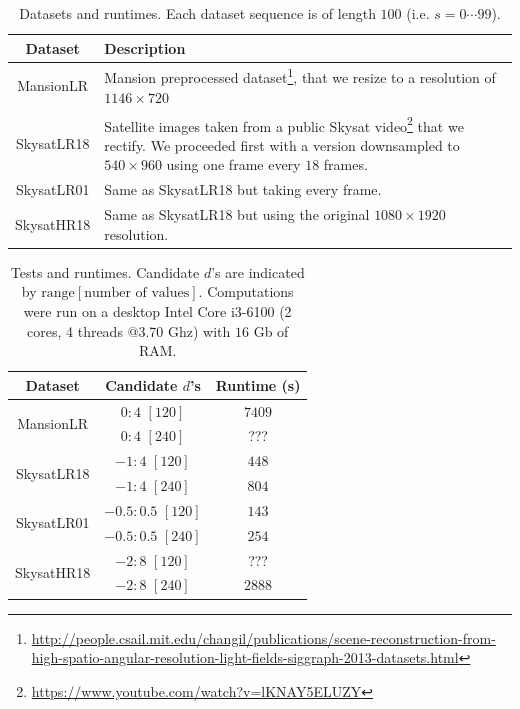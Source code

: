 \documentclass{article}
\theoremstyle{definition}
\begin{document}
\begin{savenotes}
\begin{table}[ht]
 \centering
 \begin{tabular}{|c|p{10cm}|}
  \hline
  \textbf{Dataset} & \textbf{Description} \\
  \hline \hline 
  MansionLR &Mansion preprocessed dataset\footnote{\url{http://people.csail.mit.edu/changil/publications/scene-reconstruction-from-high-spatio-angular-resolution-light-fields-siggraph-2013-datasets.html}}, that we resize to a resolution of $1146\times 720$\\
  \hline 
  SkysatLR18 & Satellite images taken from a public Skysat video\footnote{\url{https://www.youtube.com/watch?v=lKNAY5ELUZY}} that we rectify. We proceeded first with a version downsampled to $540\times 960$ using one frame every $18$ frames.\\
  \hline 
  SkysatLR01 & Same as SkysatLR18 but taking every frame.\\
  \hline 
  SkysatHR18 & Same as SkysatLR18 but using the original $1080\times 1920$ resolution.\\
  \hline
 \end{tabular}
 \caption{Datasets and runtimes. Each dataset sequence is of length $100$ (i.e. $s=0\cdots 99$). }
 \label{table:datasets}
\end{table}
\end{savenotes}


\begin{table}[ht]
\centering
  \begin{tabular}{|c|c|c|}
   \hline
  \textbf{Dataset} & \textbf{Candidate $d$'s} & \textbf{Runtime (s)}\\
  \hline \hline 
  \multirow{2}{*}{MansionLR} & $0:4$ $[120]$ & $7409$\\
  & $0:4$ $[240]$ & ???\\
  \hline 
  \multirow{2}{*}{SkysatLR18} & $-1:4$ $[120]$ & $448$\\
  & $-1:4$ $[240]$ & $804$\\
  \hline 
  \multirow{2}{*}{SkysatLR01} & $-0.5:0.5$ $[120]$ & $143$\\
  & $-0.5:0.5$ $[240]$ & $254$\\
  \hline 
  \multirow{2}{*}{SkysatHR18} & $-2:8$ $[120]$ & ???\\
  & $-2:8$ $[240]$ & $2888$\\
  \hline
  \end{tabular}

 \caption{Tests and runtimes. Candidate $d$'s are indicated by $\mathrm{range}[\text{number of values}]$. Computations were run on a desktop Intel Core i3-6100 (2 cores, 4 threads @3.70 Ghz) with $16$ Gb of RAM.}
 \label{table:tests}
\end{table}
\end{document}
